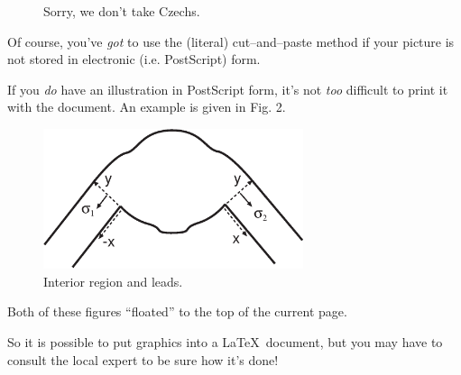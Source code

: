 \documentclass [12pt] {article}
\begin{document}
\begin{figure}
\vspace{1.5in} \caption{Sorry, we don't take Czechs.}
\end{figure}

Of course, you've {\it got\/} to use the (literal)
cut--and--paste method if your picture
is not stored in electronic (i.e. PostScript) form.

If you {\it do\/} have an illustration in PostScript form, it's
not {\it too\/} difficult to print it with the document. An
example is given in Fig. 2.

\begin{figure}
\begin{center}
 \vspace {0.2 in}
 \includegraphics[width= 3in]{sprung.eps}
 \vspace{0.1 in}
 \caption{Interior region and leads.}
\end{center}
\end{figure}

%
%

Both of these figures ``floated'' to the top of the current page.

So it is possible to put graphics into a \LaTeX\ document, but
you may have to consult
the local expert to be sure how it's done!
\end{document}
